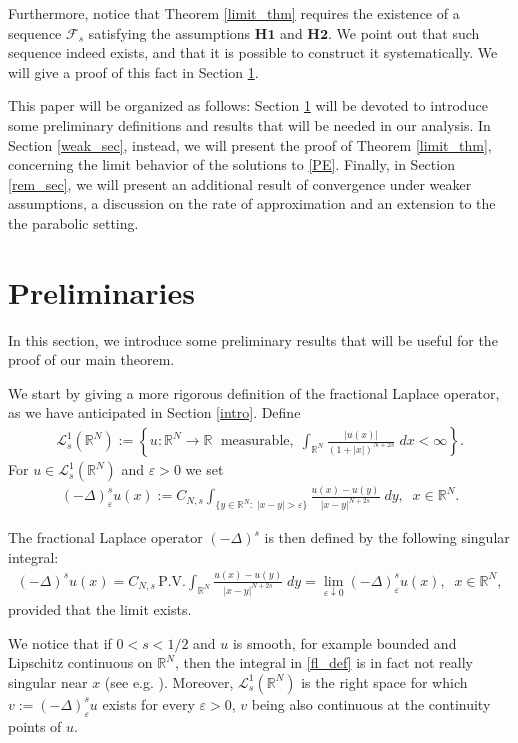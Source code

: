 \documentclass[reqno,twoside]{amsart}
\numberwithin{equation}{section}
\def\RR{{\mathbb{R}}}
\newcommand{\fl}[2]{(-\Delta)^#1#2}
\newcommand{\cns}{C_{N,s}}
\begin{document}
Furthermore, notice that Theorem \ref{limit_thm} requires the existence of a sequence $\mathcal{F}_s$ satisfying the assumptions $\textbf{H1}$ and $\textbf{H2}$. We point out that such sequence indeed exists, and that it is possible to construct it systematically. We will give a proof of this fact in Section \ref{prel}.

This paper will be organized as follows: Section \ref{prel} will be devoted to introduce some preliminary definitions and results that will be needed in our analysis. In Section \ref{weak_sec}, instead, we will present the proof of Theorem \ref{limit_thm}, concerning the limit behavior of the solutions to \eqref{PE}. Finally, in Section \ref{rem_sec}, we will present an additional result of convergence under weaker assumptions, a discussion on the rate of approximation and an extension to the the parabolic setting.

\section{Preliminaries}\label{prel}

In this section, we introduce some preliminary results that will be useful for the proof of our main theorem.

We start by giving a more rigorous definition of the fractional Laplace operator, as we have anticipated in Section \ref{intro}. Define 
\begin{align*}
	\mathcal L_s^{1}(\RR^N):=\left\{u:\RR^N\to\RR\;\mbox{ measurable},\; \int_{\RR^N}\frac{|u(x)|}{(1+|x|)^{N+2s}}\;dx<\infty\right\}.
\end{align*}
For $u\in \mathcal L_s^{1}(\RR^N)$ and $\varepsilon>0$ we set
\begin{align*}
	(-\Delta)_\varepsilon^s u(x):= C_{N,s}\int_{\{y\in\RR^N:\;|x-y|>\varepsilon\}}\frac{u(x)-u(y)}{|x-y|^{N+2s}}\;dy,\;\;x\in\RR^N.
\end{align*}

\noindent The fractional Laplace operator $\fl{s}{}$ is then defined by the following singular integral:
\begin{align}\label{fl_def}
	\fl{s}{u}(x)=\cns\,\mbox{P.V.}\int_{\RR^N}\frac{u(x)-u(y)}{|x-y|^{N+2s}}\;dy=\lim_{\varepsilon\downarrow 0}(-\Delta)_\varepsilon^s u(x),\;\;x\in\RR^N,
\end{align}
provided that the limit exists. 

We notice that if $0<s<1/2$ and $u$ is smooth, for example bounded and Lipschitz continuous on $\RR^N$, then the integral in \eqref{fl_def} is in fact not really singular near $x$ (see e.g. \cite[Remark 3.1]{dihitchhiker}). Moreover, $\mathcal L_s^{1}(\RR^N)$ is the right space for which $ v:=(-\Delta)_\varepsilon^s u$ exists for every $\varepsilon>0$, $v$ being also continuous at the continuity points of  $u$. 
\end{document}

